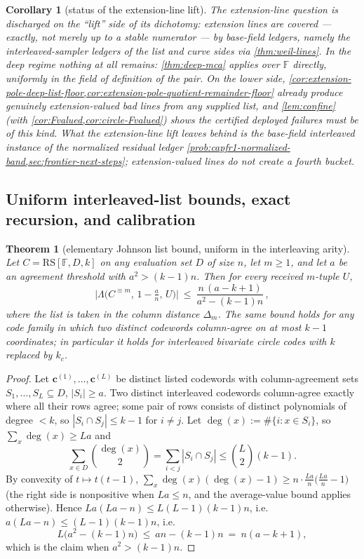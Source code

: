 \documentclass[11pt]{article}
\newtheorem{theorem}{Theorem}[section]
\newtheorem{corollary}[corollary]{Corollary}
\theoremstyle{definition}
\theoremstyle{remark}
\newcommand{\F}{\mathbb{F}}
\newcommand{\RS}{\mathrm{RS}}
\newcommand{\dist}{\Delta}
\newcommand{\Lst}{\Lambda}
\begin{document}
\begin{corollary}[status of the extension-line lift]\label{cor:T3-status}
The extension-line question is discharged on the ``lift'' side of its dichotomy: extension lines are covered --- exactly, not merely up to a stable numerator --- by base-field ledgers, namely the interleaved-sampler ledgers of the list and curve sides via \cref{thm:weil-lines}. In the deep regime nothing at all remains: \cref{thm:deep-mca} applies over $\F$ directly, uniformly in the field of definition of the pair. On the lower side, \cref{cor:extension-pole-deep-list-floor,cor:extension-pole-quotient-remainder-floor} already produce genuinely extension-valued bad lines from any supplied list, and \cref{lem:confine} \textup(with \cref{cor:Fvalued,cor:circle-Fvalued}\textup) shows the certified deployed failures must be of this kind. What the extension-line lift leaves behind is the base-field interleaved instance of the normalized residual ledger \cref{prob:capfr1-normalized-band,sec:frontier-next-steps}; extension-valued lines do not create a fourth bucket.
\end{corollary}
\subsection{Uniform interleaved-list bounds, exact recursion, and calibration}\label{sec:discharge-T4}

\begin{theorem}[elementary Johnson list bound, uniform in the interleaving arity]\label{thm:johnson-list}
Let $C=\RS[\F,D,k]$ on any evaluation set $D$ of size $n$, let $m\ge1$, and let $a$ be an agreement threshold with $a^2>(k-1)n$. Then for every received $m$-tuple $U$,
\[
\bigl|\Lst\bigl(C^{\equiv m},\,1-\tfrac an,\,U\bigr)\bigr|
\ \le\
\frac{n\,(a-k+1)}{a^2-(k-1)n}\,,
\]
where the list is taken in the column distance $\dist_m$. The same bound holds for any code family in which two distinct codewords column-agree on at most $k-1$ coordinates; in particular it holds for interleaved bivariate circle codes with $k$ replaced by $k_c$.
\end{theorem}

\begin{proof}
Let $\mathbf c^{(1)},\dots,\mathbf c^{(L)}$ be distinct listed codewords with column-agreement sets $S_1,\dots,S_L\subseteq D$, $|S_i|\ge a$. Two distinct interleaved codewords column-agree exactly where all their rows agree; some pair of rows consists of distinct polynomials of degree $<k$, so $|S_i\cap S_j|\le k-1$ for $i\ne j$. Let $\deg(x):=\#\{i:x\in S_i\}$, so $\sum_x\deg(x)\ge La$ and
\[
\sum_{x\in D}\binom{\deg(x)}2=\sum_{i<j}|S_i\cap S_j|\le\binom L2(k-1).
\]
By convexity of $t\mapsto t(t-1)$, $\sum_x\deg(x)(\deg(x)-1)\ge n\cdot\frac{La}n\bigl(\frac{La}n-1\bigr)$ \textup(the right side is nonpositive when $La\le n$, and the average-value bound applies otherwise\textup). Hence $La(La-n)\le L(L-1)(k-1)n$, i.e.\ $a(La-n)\le(L-1)(k-1)n$, i.e.
\[
L\bigl(a^2-(k-1)n\bigr)\ \le\ an-(k-1)n\ =\ n(a-k+1),
\]
which is the claim when $a^2>(k-1)n$.
\end{proof}
\end{document}
